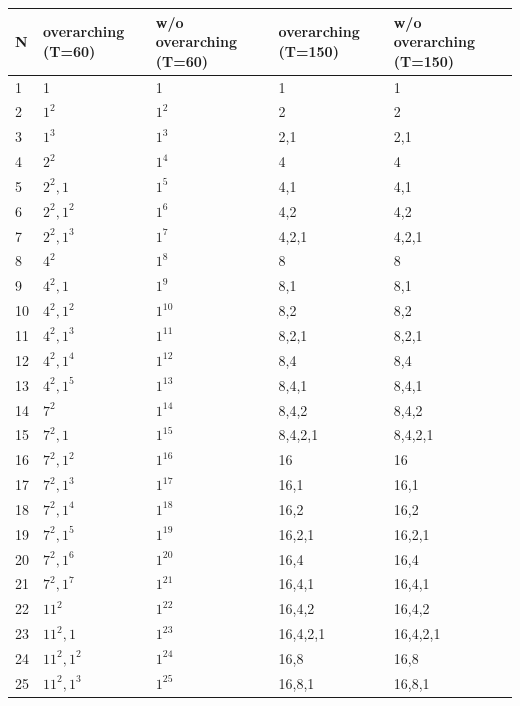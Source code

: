 \begin{tabular}{lllll}
\toprule
N & overarching (T=60) & w/o overarching (T=60) & overarching (T=150) & w/o overarching (T=150) \\
\midrule
1 & 1 & 1 & 1 & 1 \\
2 & $1^2$ & $1^2$ & 2 & 2 \\
3 & $1^3$ & $1^3$ & 2,1 & 2,1 \\
4 & $2^2$ & $1^4$ & 4 & 4 \\
5 & $2^2,1$ & $1^5$ & 4,1 & 4,1 \\
6 & $2^2,1^2$ & $1^6$ & 4,2 & 4,2 \\
7 & $2^2,1^3$ & $1^7$ & 4,2,1 & 4,2,1 \\
8 & $4^2$ & $1^8$ & 8 & 8 \\
9 & $4^2,1$ & $1^9$ & 8,1 & 8,1 \\
10 & $4^2,1^2$ & $1^10$ & 8,2 & 8,2 \\
11 & $4^2,1^3$ & $1^11$ & 8,2,1 & 8,2,1 \\
12 & $4^2,1^4$ & $1^12$ & 8,4 & 8,4 \\
13 & $4^2,1^5$ & $1^13$ & 8,4,1 & 8,4,1 \\
14 & $7^2$ & $1^14$ & 8,4,2 & 8,4,2 \\
15 & $7^2,1$ & $1^15$ & 8,4,2,1 & 8,4,2,1 \\
16 & $7^2,1^2$ & $1^16$ & 16 & 16 \\
17 & $7^2,1^3$ & $1^17$ & 16,1 & 16,1 \\
18 & $7^2,1^4$ & $1^18$ & 16,2 & 16,2 \\
19 & $7^2,1^5$ & $1^19$ & 16,2,1 & 16,2,1 \\
20 & $7^2,1^6$ & $1^20$ & 16,4 & 16,4 \\
21 & $7^2,1^7$ & $1^21$ & 16,4,1 & 16,4,1 \\
22 & $11^2$ & $1^22$ & 16,4,2 & 16,4,2 \\
23 & $11^2,1$ & $1^23$ & 16,4,2,1 & 16,4,2,1 \\
24 & $11^2,1^2$ & $1^24$ & 16,8 & 16,8 \\
25 & $11^2,1^3$ & $1^25$ & 16,8,1 & 16,8,1 \\
\bottomrule
\end{tabular}
